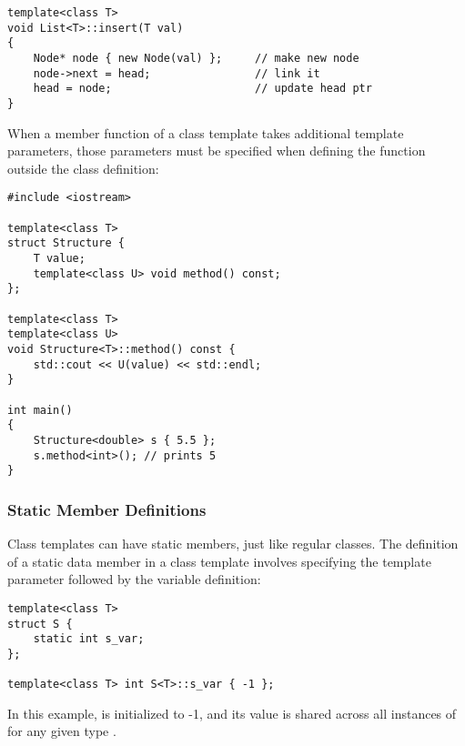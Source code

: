 \documentclass[12pt]{article}
\begin{document}
\begin{lstlisting}[style=cxx]
template<class T>
void List<T>::insert(T val)
{
    Node* node { new Node(val) };     // make new node
    node->next = head;                // link it
    head = node;                      // update head ptr
}
\end{lstlisting}

\noindent
When a member function of a class template takes additional template parameters, those parameters must be specified when defining the function outside the class definition:

\begin{lstlisting}[style=cxx]
#include <iostream>

template<class T>
struct Structure {
    T value;
    template<class U> void method() const;
};

template<class T>
template<class U>
void Structure<T>::method() const {
    std::cout << U(value) << std::endl;
}

int main()
{
    Structure<double> s { 5.5 };
    s.method<int>(); // prints 5
}
\end{lstlisting}

\subsubsection{Static Member Definitions}

\noindent
Class templates can have static members, just like regular classes.
The definition of a static data member in a class template involves specifying the template parameter followed by the variable definition:

\begin{lstlisting}[style=cxx]
template<class T>
struct S {
    static int s_var;
};

template<class T> int S<T>::s_var { -1 };
\end{lstlisting}

\noindent
In this example,  is initialized to -1, and its value is shared across all instances of  for any given type .
\end{document}

